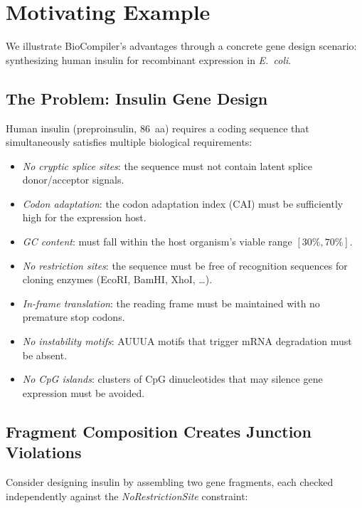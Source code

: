 \documentclass[runningheads]{llncs}
\begin{document}
\section{Motivating Example}\label{sec:motivating}

We illustrate BioCompiler's advantages through a concrete gene design
scenario: synthesizing human insulin for recombinant expression in
\emph{E.~coli}.

\subsection{The Problem: Insulin Gene Design}

Human insulin (preproinsulin, 86~aa) requires a coding sequence that
simultaneously satisfies multiple biological requirements:
\begin{itemize}[leftmargin=*,itemsep=0pt,topsep=1pt]
\item \emph{No cryptic splice sites}: the sequence must not contain
      latent splice donor/acceptor signals.
\item \emph{Codon adaptation}: the codon adaptation index (CAI) must be
      sufficiently high for the expression host.
\item \emph{GC content}: must fall within the host organism's viable
      range $[30\%, 70\%]$.
\item \emph{No restriction sites}: the sequence must be free of
      recognition sequences for cloning enzymes (EcoRI, BamHI, XhoI,
      \dots).
\item \emph{In-frame translation}: the reading frame must be maintained
      with no premature stop codons.
\item \emph{No instability motifs}: AUUUA motifs that trigger mRNA
      degradation must be absent.
\item \emph{No CpG islands}: clusters of CpG dinucleotides that may
      silence gene expression must be avoided.
\end{itemize}

\subsection{Fragment Composition Creates Junction Violations}

Consider designing insulin by assembling two gene fragments, each
checked independently against the \emph{NoRestrictionSite} constraint:
\end{document}
